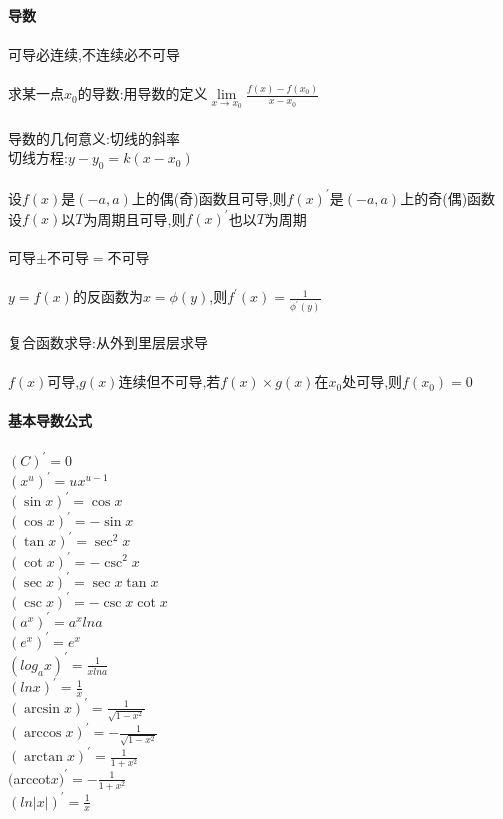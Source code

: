 \documentclass{article}
\begin{document}
\begin{flushleft}
	\fontsize{24pt}{30pt}\selectfont
	
	~\\ \textbf{导数} \\~\\
	
	可导必连续,不连续必不可导\\
	~\\
	求某一点$x_0$的导数:用导数的定义$\lim\limits_{x\to x_0} \frac{f(x)-f(x_0
		)}{x-x_0}$\\
	~\\
	导数的几何意义:切线的斜率\\
	切线方程:$y-y_0=k(x-x_0)$\\
	~\\
	设$f(x)$是$(-a,a)$上的偶(奇)函数且可导,则$f(x)^{'}$是$(-a,a)$上的奇(偶)函数\\
	设$f(x)$以$T$为周期且可导,则$f(x)^{'}$也以$T$为周期\\
	~\\
	可导$\pm$不可导$=$不可导\\
	~\\
	$y=f(x)$的反函数为$x=\phi(y)$,则$f^{'}(x)=\frac{1}{\phi^{'}(y)}$\\
	~\\
	复合函数求导:从外到里层层求导\\
	~\\
	$f(x)$可导,$g(x)$连续但不可导,若$f(x)\times g(x)$在$x_0$处可导,则$f(x_0)=0$\\
	
	~\\ \textbf{基本导数公式}\\~\\
	
	$(C)^{'}=0$\\
	$(x^u)^{'}=ux^{u-1}$\\
	$(\sin x)^{'}=\cos x$\\
	$(\cos x)^{'}=-\sin x$\\
	$(\tan x)^{'}=\sec^2 x$\\
	$(\cot x)^{'}=-\csc^2 x$\\
	$(\sec x)^{'}=\sec x\tan x$\\
	$(\csc x)^{'}=-\csc x\cot x$\\
	$(a^x)^{'}=a^xlna$\\
	$(e^x)^{'}=e^x$\\
	$(log_ax)^{'}=\frac{1}{xlna}$\\
	$(lnx)^{'}=\frac{1}{x}$\\
	$(\arcsin x)^{'}=\frac{1}{\sqrt{1-x^2}}$\\
	$(\arccos x)^{'}=-\frac{1}{\sqrt{1-x^2}}$\\
	$(\arctan x)^{'}=\frac{1}{1+x^2}$\\
	$($arccot$ x)^{'}=-\frac{1}{1+x^2}$\\
	$(ln|x|)^{'}=\frac{1}{x}$\\
	

\end{flushleft}
\end{document}
